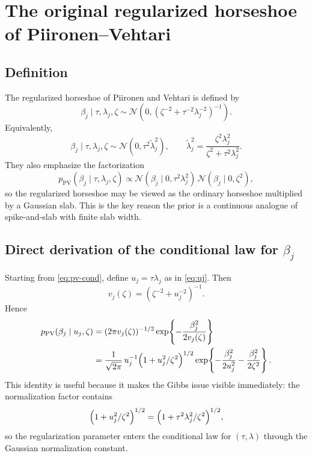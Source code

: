 \documentclass[11pt]{article}
\newcommand{\Normal}{\mathcal{N}}
\newcommand{\PV}{\mathrm{PV}}
\begin{document}
\section{The original regularized horseshoe of Piironen--Vehtari}

\subsection{Definition}

The regularized horseshoe of Piironen and Vehtari is defined by
\begin{equation}
\beta_j \mid \tau,\lambda_j,\zeta \sim \Normal\!\left(0,\left(\zeta^{-2}+\tau^{-2}\lambda_j^{-2}\right)^{-1}\right).
\label{eq:pv-cond}
\end{equation}
Equivalently,
\begin{equation}
\beta_j \mid \tau,\lambda_j,\zeta \sim \Normal\!\left(0,\tau^2\tilde{\lambda}_j^2\right),
\qquad
\tilde{\lambda}_j^2=\frac{\zeta^2\lambda_j^2}{\zeta^2+\tau^2\lambda_j^2}.
\label{eq:pv-tilde-lambda}
\end{equation}
They also emphasize the factorization
\begin{equation}
p_{\PV}(\beta_j \mid \tau,\lambda_j,\zeta)
\propto
\Normal(\beta_j \mid 0,\tau^2\lambda_j^2)\,
\Normal(\beta_j \mid 0,\zeta^2),
\label{eq:pv-product}
\end{equation}
so the regularized horseshoe may be viewed as the ordinary horseshoe multiplied by a Gaussian slab. This is the key reason the prior is a continuous analogue of spike-and-slab with finite slab width.

\subsection{Direct derivation of the conditional law for $\beta_j$}

Starting from \eqref{eq:pv-cond}, define $u_j=\tau\lambda_j$ as in \eqref{eq:uj}. Then
\[
v_j(\zeta)=\left(\zeta^{-2}+u_j^{-2}\right)^{-1}.
\]
Hence
\begin{align}
p_{\PV}(\beta_j \mid u_j,\zeta)
&=
(2\pi v_j(\zeta))^{-1/2}
\exp\!\left\{-\frac{\beta_j^2}{2v_j(\zeta)}\right\} \notag\\
&=
\frac{1}{\sqrt{2\pi}}\,
u_j^{-1}\Bigl(1+u_j^2/\zeta^2\Bigr)^{1/2}
\exp\!\left\{-\frac{\beta_j^2}{2u_j^2}-\frac{\beta_j^2}{2\zeta^2}\right\}.
\label{eq:pv-density-expanded}
\end{align}
This identity is useful because it makes the Gibbs issue visible immediately: the normalization factor contains
\[
\Bigl(1+u_j^2/\zeta^2\Bigr)^{1/2}
=
\Bigl(1+\tau^2\lambda_j^2/\zeta^2\Bigr)^{1/2},
\]
so the regularization parameter enters the conditional law for $(\tau,\lambda)$ through the Gaussian normalization constant.
\end{document}
